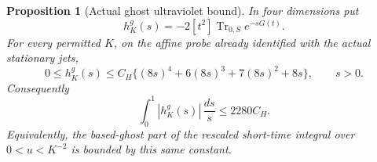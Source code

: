 \documentclass[11pt]{article}
\newtheorem{proposition}[theorem]{Proposition}
\theoremstyle{remark}
\begin{document}
\begin{proposition}[Actual ghost ultraviolet bound]
\label{ahc-ghost-short}
In four dimensions put
\[
 h^g_K(s)=-2[t^2]\operatorname{Tr}_{0,S}e^{-sG(t)}.
\]
For every permitted \(K\), on the affine probe already
identified with the actual stationary jets,
\begin{equation}
 0\le h^g_K(s)\le C_H\{(8s)^4+6(8s)^3+7(8s)^2+8s\},
                     \qquad s>0.
 \label{ahc-ghost-poisson}
\end{equation}
Consequently
\begin{equation}
 \int_0^1 |h^g_K(s)|\,\frac{ds}{s}\le2280C_H.
 \label{ahc-ghost-uv}
\end{equation}
Equivalently, the based-ghost part of the rescaled
short-time integral over \(0<u<K^{-2}\) is bounded
by this same constant.
\end{proposition}
\end{document}
